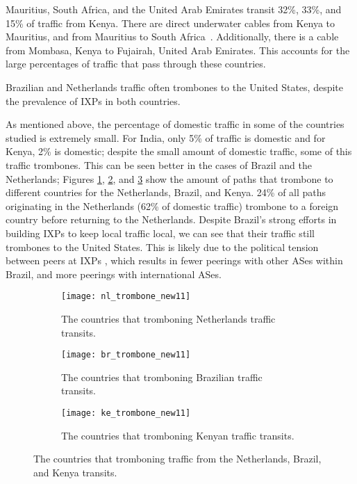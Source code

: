 Mauritius, South Africa, and the United Arab Emirates transit 32\%, 33\%, and 15\% of traffic from Kenya.  There are direct underwater cables from Kenya to Mauritius, and from Mauritius to South Africa~\cite{cablemap}.  Additionally, there is a cable from Mombasa, Kenya to Fujairah, United Arab Emirates.  This accounts for the large percentages of traffic that pass through these countries.

\begin{finding}
Brazilian and Netherlands traffic often trombones to the United States, despite the prevalence of IXPs in both countries.
\end{finding}
As mentioned above, the percentage of domestic traffic in some of the countries studied is extremely small.  For India, only 5\% of traffic is domestic and for Kenya, 2\% is domestic; despite the small amount of domestic traffic, some of this traffic trombones.  This can be seen better in the cases of Brazil and the Netherlands; 
Figures \ref{fig:trombone_netherlands}, \ref{fig:trombone_brazil}, and \ref{fig:trombone_kenya} show the amount of paths that trombone to different countries for the Netherlands, Brazil, and Kenya. 24\% of all paths originating in the Netherlands (62\% of domestic traffic) trombone to a foreign country before returning to the Netherlands. Despite Brazil's strong efforts in building IXPs to keep local traffic local, we can see that their traffic still trombones to the United States.  This is likely due to the political tension between peers at IXPs , which results in fewer peerings with other ASes within Brazil, and more peerings with international ASes. 

\begin{figure*}[t!]
\begin{minipage}{\linewidth}
\begin{subfigure}[b]{.32\linewidth}
\texttt{[image: nl\_trombone\_new11]}
\caption{The countries that tromboning Netherlands traffic transits.\label{fig:trombone_netherlands}}
\end{subfigure}\qquad
\begin{subfigure}[b]{.32\linewidth}
\texttt{[image: br\_trombone\_new11]}
\caption{The countries that tromboning Brazilian traffic transits.\label{fig:trombone_brazil}}
\end{subfigure}\qquad
\begin{subfigure}[b]{.32\linewidth}
\texttt{[image: ke\_trombone\_new11]}
\caption{The countries that tromboning Kenyan traffic transits.\label{fig:trombone_kenya}}
\end{subfigure}
\end{minipage}
\caption{The countries that tromboning traffic from the Netherlands, Brazil, and Kenya transits.}
\label{fig:trombone}
\end{figure*}

